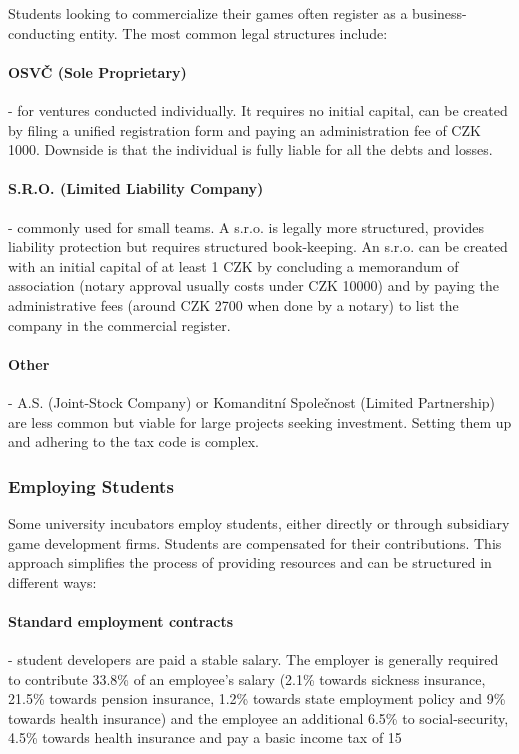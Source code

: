 Students looking to commercialize their games often register as a business-conducting entity. The most common legal structures include:
\paragraph{OSVČ (Sole Proprietary)} - for ventures conducted individually. It requires no initial capital, can be created by filing a unified registration form and paying an administration fee of CZK 1000. Downside is that the individual is fully liable for all the debts and losses.
\paragraph{S.R.O. (Limited Liability Company)} - commonly used for small teams. A s.r.o. is legally more structured, provides liability protection but requires structured book-keeping. An s.r.o. can be created with an initial capital of at least 1 CZK by concluding a memorandum of association (notary approval usually costs under CZK 10000) and by paying the administrative fees (around CZK 2700 when done by a notary) to list the company in the commercial register.
\paragraph{Other} - A.S. (Joint-Stock Company) or Komanditní Společnost (Limited Partnership) are less common but viable for large projects seeking investment. Setting them up and adhering to the tax code is complex.

\subsubsection{Employing Students}
Some university incubators employ students, either directly or through subsidiary game development firms. Students are compensated for their contributions. This approach simplifies the process of providing resources and can be structured in different ways:
\paragraph{Standard employment contracts} - student developers are paid a stable salary. The employer is generally required to contribute 33.8\% of an employee’s salary (2.1\% towards sickness insurance, 21.5\% towards pension insurance, 1.2\% towards state employment policy and 9\% towards health insurance) and the employee an additional 6.5\% to social-security, 4.5\% towards health insurance and pay a basic income tax of 15 %
